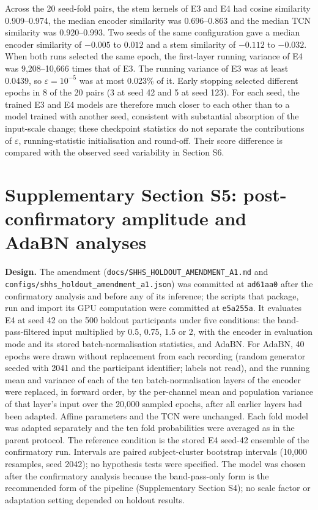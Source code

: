 \documentclass[10pt,a4paper]{article}
\begin{document}
Across the 20 seed-fold pairs, the stem kernels of E3 and E4 had cosine similarity 0.909--0.974, the
median encoder similarity was 0.696--0.863 and the median TCN similarity was 0.920--0.993. Two seeds of
the same configuration gave a median encoder similarity of $-0.005$ to $0.012$ and a stem similarity of
$-0.112$ to $-0.032$. When both runs selected the same epoch, the first-layer running variance of E4
was 9{,}208--10{,}666 times that of E3. The running variance of E3 was at least 0.0439, so
$\varepsilon=10^{-5}$ was at most 0.023\% of it. Early stopping selected different epochs in 8 of the 20
pairs (3 at seed 42 and 5 at seed 123). For each seed, the trained E3 and E4 models are therefore much
closer to each other than to a model trained with another seed, consistent with substantial absorption
of the input-scale change; these checkpoint statistics do not separate the contributions of
$\varepsilon$, running-statistic initialisation and round-off. Their score difference is compared with
the observed seed variability in Section S6.

\section*{Supplementary Section S5: post-confirmatory amplitude and AdaBN analyses}
\label{sec:sup_amendment}

\textbf{Design.} The amendment (\nolinkurl{docs/SHHS_HOLDOUT_AMENDMENT_A1.md} and
\nolinkurl{configs/shhs_holdout_amendment_a1.json}) was committed at \texttt{ad61aa0} after the
confirmatory analysis and before any of its inference; the scripts that package, run and import its GPU
computation were committed at \texttt{e5a255a}. It evaluates E4 at seed 42 on the 500 holdout
participants under five conditions: the band-pass-filtered input multiplied by 0.5, 0.75, 1.5 or 2,
with the encoder in evaluation mode and its stored batch-normalisation statistics, and AdaBN. For AdaBN,
40 epochs were drawn without replacement from each recording (random generator seeded with 2041 and the
participant identifier; labels not read), and the running mean and variance of each of the ten
batch-normalisation layers of the encoder were replaced, in forward order, by the per-channel mean and
population variance of that layer's input over the 20{,}000 sampled epochs, after all earlier layers had
been adapted. Affine parameters and the TCN were unchanged. Each fold model was adapted separately and
the ten fold probabilities were averaged as in the parent protocol. The reference condition is the
stored E4 seed-42 ensemble of the confirmatory run. Intervals are paired subject-cluster bootstrap
intervals (10{,}000 resamples, seed 2042); no hypothesis tests were specified. The model was chosen
after the confirmatory analysis because the band-pass-only form is the recommended form of the pipeline
(Supplementary Section S4); no scale factor or adaptation setting depended on holdout results.
\end{document}
